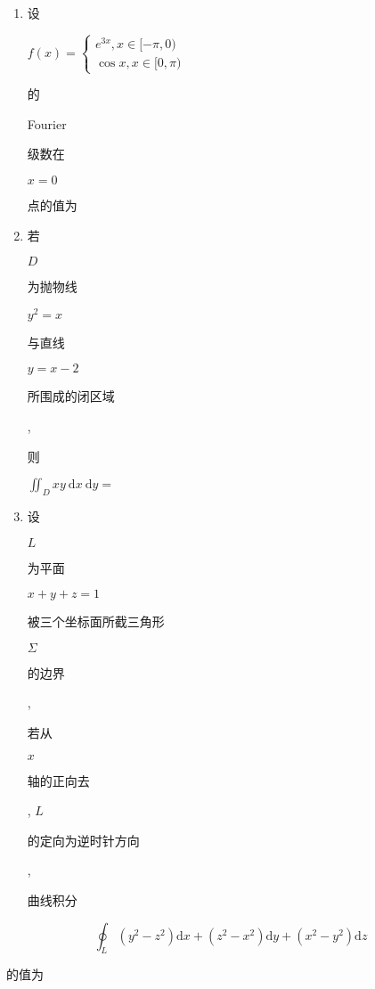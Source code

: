\documentclass[10pt]{article}
\begin{document}
\begin{enumerate}
  \item \begin{CJK}{UTF8}{mj}设\end{CJK} $f(x)=\left\{\begin{array}{l}e^{3 x}, x \in[-\pi, 0) \\ \cos x, x \in[0, \pi)\end{array}\right.$ \begin{CJK}{UTF8}{mj}的\end{CJK} Fourier \begin{CJK}{UTF8}{mj}级数在\end{CJK} $x=0$ \begin{CJK}{UTF8}{mj}点的值为\end{CJK}

  \item \begin{CJK}{UTF8}{mj}若\end{CJK} $D$ \begin{CJK}{UTF8}{mj}为抛物线\end{CJK} $y^{2}=x$ \begin{CJK}{UTF8}{mj}与直线\end{CJK} $y=x-2$ \begin{CJK}{UTF8}{mj}所围成的闭区域\end{CJK}, \begin{CJK}{UTF8}{mj}则\end{CJK} $\iint_{D} x y \mathrm{~d} x \mathrm{~d} y=$

  \item \begin{CJK}{UTF8}{mj}设\end{CJK} $L$ \begin{CJK}{UTF8}{mj}为平面\end{CJK} $x+y+z=1$ \begin{CJK}{UTF8}{mj}被三个坐标面所截三角形\end{CJK} $\Sigma$ \begin{CJK}{UTF8}{mj}的边界\end{CJK}, \begin{CJK}{UTF8}{mj}若从\end{CJK} $x$ \begin{CJK}{UTF8}{mj}轴的正向去\end{CJK}, $L$ \begin{CJK}{UTF8}{mj}的定向为逆时针方向\end{CJK}, \begin{CJK}{UTF8}{mj}曲线积分\end{CJK}

\end{enumerate}
$$
\oint_{L}\left(y^{2}-z^{2}\right) \mathrm{d} x+\left(z^{2}-x^{2}\right) \mathrm{d} y+\left(x^{2}-y^{2}\right) \mathrm{d} z
$$
\begin{CJK}{UTF8}{mj}的值为\end{CJK}
\end{document}
